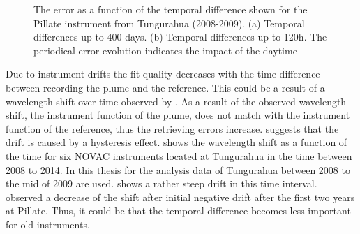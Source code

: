 \begin{figure}
	\caption{The  error as a function of the temporal difference shown for the Pillate instrument from Tungurahua (2008-2009). (a) Temporal differences up to 400 days. (b) Temporal differences up to 120h. The periodical   error evolution indicates the impact of the daytime}
	\label{fig:dat}
\end{figure}
%
Due to instrument drifts the fit quality decreases with the time difference between recording the plume and the reference. This could be a result of a wavelength shift over time observed by \citet{WarnachSimon}. As a result of the observed wavelength shift, the instrument function of the plume, does not match with the instrument function of the reference, thus the retrieving errors increase. \citet{WarnachSimon} suggests that the drift is caused by a hysteresis effect.  shows the wavelength shift as a function of the time for six NOVAC instruments located at Tungurahua in the time between 2008 to 2014. In this thesis for the analysis data of Tungurahua between 2008 to the mid of 2009 are used.  shows a rather steep drift in this time interval. \citet{WarnachSimon} observed a decrease of the shift after initial negative drift after the first two years at Pillate. Thus, it could be that the temporal difference becomes less important for old instruments.\\
